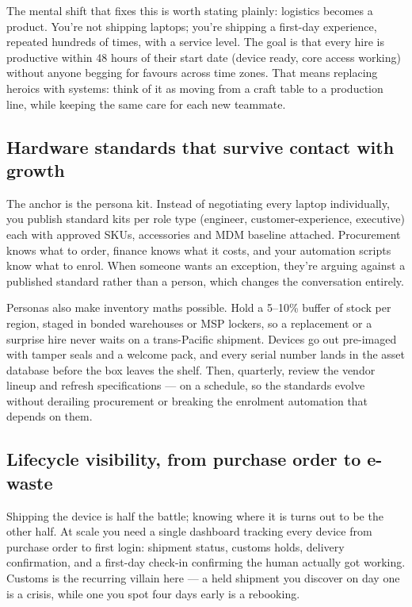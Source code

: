 The mental shift that fixes this is worth stating plainly: logistics becomes a product. You're not shipping laptops; you're shipping a first-day experience, repeated hundreds of times, with a service level. The goal is that every hire is productive within 48 hours of their start date (device ready, core access working) without anyone begging for favours across time zones. That means replacing heroics with systems: think of it as moving from a craft table to a production line, while keeping the same care for each new teammate.



\subsection{Hardware standards that survive contact with growth}


The anchor is the persona kit. Instead of negotiating every laptop individually, you publish standard kits per role type (engineer, customer-experience, executive) each with approved SKUs, accessories and MDM baseline attached. Procurement knows what to order, finance knows what it costs, and your automation scripts know what to enrol. When someone wants an exception, they're arguing against a published standard rather than a person, which changes the conversation entirely.


Personas also make inventory maths possible. Hold a 5–10\% buffer of stock per region, staged in bonded warehouses or MSP lockers, so a replacement or a surprise hire never waits on a trans-Pacific shipment. Devices go out pre-imaged with tamper seals and a welcome pack, and every serial number lands in the asset database before the box leaves the shelf. Then, quarterly, review the vendor lineup and refresh specifications — on a schedule, so the standards evolve without derailing procurement or breaking the enrolment automation that depends on them.



\subsection{Lifecycle visibility, from purchase order to e-waste}


Shipping the device is half the battle; knowing where it is turns out to be the other half. At scale you need a single dashboard tracking every device from purchase order to first login: shipment status, customs holds, delivery confirmation, and a first-day check-in confirming the human actually got working. Customs is the recurring villain here — a held shipment you discover on day one is a crisis, while one you spot four days early is a rebooking.


